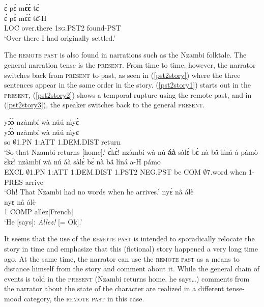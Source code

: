 \begin{exe} 
\ex\label{PST2b}
  \glll   ɛ́ pɛ̀ m{\bfseries ɛ́ɛ̀} tɛ́ \\
          ɛ́ pɛ̀ mɛ́ɛ̀ tɛ̂-H \\
           LOC over.there 1\textsc{sg}.PST2 found-PST \\
    \trans `Over there I had originally settled.'
\end{exe}

The \textsc{remote past} is also found in narrations such as the Nzambi folktale. The general narration tense is the \textsc{present}. From time to time, however, the narrator switches back from \textsc{present} to past, as seen in (\ref{pst2story}) where the three sentences appear in the same order in the story. (\ref{pst2story1}) starts out in the \textsc{present}, (\ref{pst2story2}) shows a temporal rupture using the remote past, and in (\ref{pst2story3}), the speaker switches back to the general \textsc{present}. 


\begin{exe} 
\ex\label{pst2story}
\begin{xlist}
\ex\label{pst2story1}
  \glll yɔ́ɔ̀ nzàmbí wà núú nìyɛ̀ \\
        yɔ́ɔ̀ nzàmbí wà núú nìyɛ \\
         so $\emptyset$1.PN 1:ATT 1.DEM.DIST return\\
    \trans `So that Nzambi returns [home].'
\ex\label{pst2story2}
  \glll ɛ́kɛ̀! nzàmbí wà nú {\bfseries áà} sàlɛ́ bɛ̀ nà bã̂ líná-á pámò \\
      ɛ́kɛ̀! nzàmbí wà nú áà sàlɛ́ bɛ̀ nà bã̂ líná a-H pámo \\
        EXCL $\emptyset$1.PN 1:ATT 1.DEM.DIST 1.PST2 NEG.PST be COM $\emptyset$7.word when 1-PRES arrive  \\
    \trans `Oh! That Nzambi had no words when he arrives.'
\ex\label{pst2story3}
\glll nyɛ̀ nâ álè \\
       nyɛ nâ álè \\
       1 COMP allez[French]  \\
    \trans `He [says]: {\itshape Allez!} [= Ok].'
\end{xlist}
\end{exe}

\noindent It seems that the use of the \textsc{remote past} is intended to sporadically relocate the story in time and emphasize that this (fictional) story happened a very long time ago. At the same time, the narrator can use the \textsc{remote past} as a means to distance himself from the story and comment about it. While the general chain of events is told in the \textsc{present} (Nzambi returns home, he says\ldots) comments from the narrator about the state of the character are realized in a different tense-mood category, the \textsc{remote past} in this case. 


